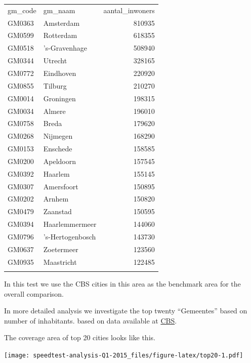 \documentclass[]{article}
\begin{document}
\begin{longtable}[c]{@{}llr@{}}
\toprule\addlinespace
gm\_code & gm\_naam & aantal\_inwoners
\\\addlinespace
\midrule\endhead
GM0363 & Amsterdam & 810935
\\\addlinespace
GM0599 & Rotterdam & 618355
\\\addlinespace
GM0518 & 's-Gravenhage & 508940
\\\addlinespace
GM0344 & Utrecht & 328165
\\\addlinespace
GM0772 & Eindhoven & 220920
\\\addlinespace
GM0855 & Tilburg & 210270
\\\addlinespace
GM0014 & Groningen & 198315
\\\addlinespace
GM0034 & Almere & 196010
\\\addlinespace
GM0758 & Breda & 179620
\\\addlinespace
GM0268 & Nijmegen & 168290
\\\addlinespace
GM0153 & Enschede & 158585
\\\addlinespace
GM0200 & Apeldoorn & 157545
\\\addlinespace
GM0392 & Haarlem & 155145
\\\addlinespace
GM0307 & Amersfoort & 150895
\\\addlinespace
GM0202 & Arnhem & 150820
\\\addlinespace
GM0479 & Zaanstad & 150595
\\\addlinespace
GM0394 & Haarlemmermeer & 144060
\\\addlinespace
GM0796 & 's-Hertogenbosch & 143730
\\\addlinespace
GM0637 & Zoetermeer & 123560
\\\addlinespace
GM0935 & Maastricht & 122485
\\\addlinespace
\bottomrule
\end{longtable}

In this test we use the CBS cities in this area as the benchmark area
for the overall comparison.

In more detailed analysis we investigate the top twenty ``Gemeentes''
based on number of inhabitants. based on data available at
\href{http://www.cbs.nl/nl-NL/menu/themas/dossiers/nederland-regionaal/publicaties/geografische-data/archief/2014/2013-wijk-en-buurtkaart-art.htm}{CBS}.

The coverage area of top 20 cities looks like this.

\texttt{[image: speedtest-analysis-Q1-2015\_files/figure-latex/top20-1.pdf]}
\end{document}
